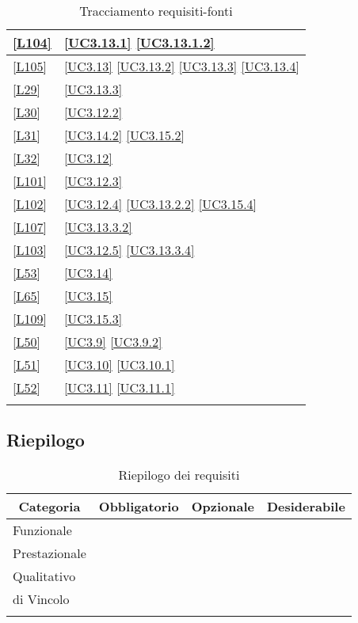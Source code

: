 \begin{longtable}{|P{6cm}|P{6cm}|}
	\hline \ref{L104} & \ref{UC3.13.1} \linebreak \ref{UC3.13.1.2} \\
	\hline \ref{L105} & \ref{UC3.13} \linebreak \ref{UC3.13.2} \linebreak \ref{UC3.13.3} \linebreak \ref{UC3.13.4} \\
	\hline \ref{L29} & \ref{UC3.13.3} \\
	\hline \ref{L30} & \ref{UC3.12.2} \\
	\hline \ref{L31} & \ref{UC3.14.2} \linebreak \ref{UC3.15.2} \\
	\hline \ref{L32} & \ref{UC3.12} \\
	\hline \ref{L101} & \ref{UC3.12.3} \\
	\hline \ref{L102} & \ref{UC3.12.4} \linebreak \ref{UC3.13.2.2} \linebreak \ref{UC3.15.4} \\
	\hline \ref{L107} & \ref{UC3.13.3.2} \\
	\hline \ref{L103} & \ref{UC3.12.5} \linebreak \ref{UC3.13.3.4} \\
	\hline \ref{L53} & \ref{UC3.14} \\
	\hline \ref{L65} & \ref{UC3.15} \\
	\hline \ref{L109} & \ref{UC3.15.3} \\
	\hline \ref{L50} & \ref{UC3.9} \linebreak \ref{UC3.9.2}\\
	\hline \ref{L51} & \ref{UC3.10} \linebreak \ref{UC3.10.1}\\
	\hline \ref{L52} & \ref{UC3.11} \linebreak \ref{UC3.11.1}\\	
	\hline
	\caption{Tracciamento requisiti-fonti}
\end{longtable}

\subsection{Riepilogo}

\begin{longtable}{|l|c|c|c|}
	\hline \multicolumn{1}{|c|}{\textbf{Categoria}} & \multicolumn{1}{c|}{\textbf{Obbligatorio}} & \multicolumn{1}{c|}{\textbf{Opzionale}} & \multicolumn{1}{c|}{\textbf{Desiderabile}} \\
	\endfirsthead
	\hline Funzionale & \thetotObF & \thetotOpF & \thetotDF \\
	\hline Prestazionale & \thetotObP & \thetotOpP & \thetotDP \\
	\hline Qualitativo & \thetotObQ & \thetotOpQ & \thetotDQ \\
	\hline di Vincolo & \thetotObV & \thetotOpV & \thetotDV \\
	\hline
	\caption{Riepilogo dei requisiti}
\end{longtable}
